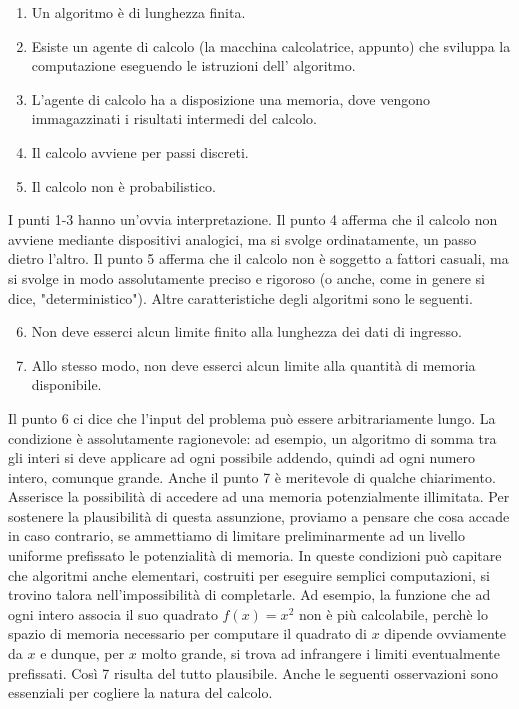 \begin{enumerate}
    \item Un algoritmo è di lunghezza finita.
    \item Esiste un agente di calcolo (la macchina calcolatrice, appunto) che sviluppa la
          computazione eseguendo le istruzioni dell' algoritmo.
    \item L'agente di calcolo ha a disposizione una memoria, dove vengono immagazzinati i risultati intermedi
          del calcolo.
    \item Il calcolo avviene per passi discreti.
    \item Il calcolo non è probabilistico.
\end{enumerate}

I punti 1-3 hanno un'ovvia interpretazione. Il punto 4 afferma che il calcolo non
avviene mediante dispositivi analogici, ma si svolge ordinatamente, un passo dietro l'altro.
Il punto 5 afferma che il calcolo non è soggetto a fattori casuali, ma si
svolge in modo assolutamente preciso e rigoroso (o anche, come in genere si dice,
"deterministico"). Altre caratteristiche degli algoritmi sono le seguenti.

\begin{enumerate}
    \setcounter{enumi}{5}
    \item Non deve esserci alcun limite finito alla lunghezza dei dati di ingresso.
    \item Allo stesso modo, non deve esserci alcun limite alla quantità di memoria
          disponibile.
\end{enumerate}

Il punto 6 ci dice che l'input del problema può essere arbitrariamente lungo.
La condizione è assolutamente ragionevole: ad esempio, un algoritmo di somma tra
gli interi si deve applicare ad ogni possibile addendo, quindi ad ogni numero intero, comunque grande.
Anche il punto 7 è meritevole di qualche chiarimento.
Asserisce la possibilità di accedere ad una memoria potenzialmente illimitata.
Per sostenere la plausibilità di questa assunzione, proviamo a pensare che cosa accade in caso contrario,
se ammettiamo di limitare preliminarmente ad un livello uniforme prefissato le potenzialità di memoria.
In queste condizioni può capitare che algoritmi anche elementari, costruiti per eseguire semplici computazioni,
si trovino talora nell'impossibilità di completarle. Ad esempio, la funzione che ad
ogni intero associa il suo quadrato $f(x) = x^{2}$ non è più calcolabile, perchè lo
spazio di memoria necessario per computare il quadrato di $x$ dipende ovviamente
da $x$ e dunque, per $x$ molto grande, si trova ad infrangere i limiti eventualmente
prefissati. Così 7 risulta del tutto plausibile.
Anche le seguenti osservazioni sono essenziali per cogliere la natura del calcolo.

